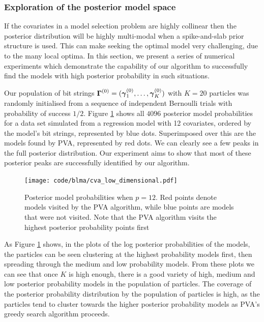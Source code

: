 \subsubsection{Exploration of the posterior model space}

If the covariates in a model selection problem are highly collinear then the
posterior distribution will be highly multi-modal when a spike-and-slab prior
structure is used. This can make seeking the optimal model very challenging,
due to the many local optima. In this section, we present a series of numerical
experiments which demonstrate the capability of our algorithm to successfully
find the models with high posterior probability in such situations.

Our population of bit strings ${\boldsymbol \Gamma}^{(0)} = ({\boldsymbol \gamma}_1^{(0)}, \ldots,
{\boldsymbol \gamma}_K^{(0)})$ with $K = 20$ particles was randomly initialised from a
sequence of independent Bernoulli trials with probability of success $1/2$.
Figure \ref{fig:PVA_posterior_models} shows all $4096$ posterior model
probabilities for a data set simulated from a regression model with 12
covariates, ordered by the model's bit strings, represented by blue dots.
Superimposed over this are the models found by PVA, represented by red dots.
We can clearly see a few peaks in the full posterior distribution. Our
experiment aims to show that most of these posterior peaks are successfully
identified by our algorithm.

\begin{figure}[b!]
	\texttt{[image: code/blma/cva\_low\_dimensional.pdf]}
	\caption{Posterior model probabilities when $p = 12$. Red points denote models visited by the PVA
		algorithm, while blue points are models that were not visited. Note that the PVA algorithm
		visits the highest posterior probability points first}
	\label{fig:PVA_posterior_models}
\end{figure}


As Figure \ref{fig:PVA_posterior_models} shows, in the plots of the log
posterior probabilities of the models, the particles can be seen clustering at
the highest probability models first, then spreading through the medium and low
probability models. From these plots we can see that once $K$ is high enough,
there is a good variety of high, medium and low posterior probability models in
the population of particles. The coverage of the posterior probability
distribution by the population of particles is high, as the particles tend to
cluster towards the higher posterior probability models as PVA's greedy search
algorithm proceeds.

